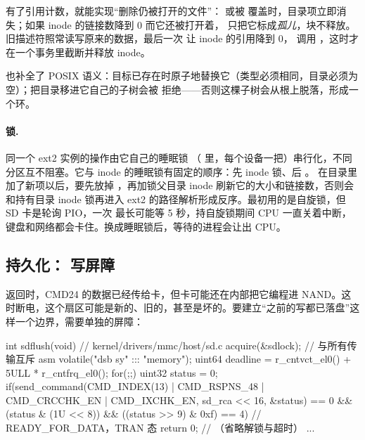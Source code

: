 有了引用计数，就能实现“删除仍被打开的文件”： 或被  覆盖时，目录项立即消失；如果 inode 的链接数降到 0 而它还被打开着， 只把它标成\emph{孤儿}，块不释放。旧描述符照常读写原来的数据，最后一次  让 inode 的引用降到 0， 调用 ，这时才在一个事务里截断并释放 inode。

 也补全了 POSIX 语义：目标已存在时原子地替换它（类型必须相同，目录必须为空）；把目录移进它自己的子树会被  拒绝——否则这棵子树会从根上脱落，形成一个环。

\paragraph{锁.} 同一个 ext2 实例的操作由它自己的睡眠锁 （ 里，每个设备一把）串行化，不同分区互不阻塞。它与 inode 的睡眠锁有固定的顺序：先 inode 锁、后 。 在目录里加了新项以后，要先放掉 ，再加锁父目录 inode 刷新它的大小和链接数，否则会和持有目录 inode 锁再进入 ext2 的路径解析形成反序。最初用的是自旋锁，但 SD 卡是轮询 PIO，一次  最长可能等 5 秒，持自旋锁期间 CPU 一直关着中断，键盘和网络都会卡住。换成睡眠锁后，等待的进程会让出 CPU。

\subsection{持久化： 写屏障}

 返回时，CMD24 的数据已经传给卡，但卡可能还在内部把它编程进 NAND。这时断电，这个扇区可能是新的、旧的，甚至是坏的。要建立“之前的写都已落盘”这样一个边界，需要单独的屏障：

\begin{ccode}
int sdflush(void) {                                         // kernel/drivers/mmc/host/sd.c
  acquire(&sdlock);                                         // 与所有传输互斥
  asm volatile("dsb sy" ::: "memory");
  uint64 deadline = r_cntvct_el0() + 5ULL * r_cntfrq_el0();
  for(;;){
    uint32 status = 0;
    if(send_command(CMD_INDEX(13) | CMD_RSPNS_48 | CMD_CRCCHK_EN | CMD_IXCHK_EN,
                    sd_rca << 16, &status) == 0 &&
       (status & (1U << 8)) && ((status >> 9) & 0xf) == 4)  // READY_FOR_DATA，TRAN 态
      return 0;                                             // （省略解锁与超时）
    ...
  }
}
\end{ccode}

